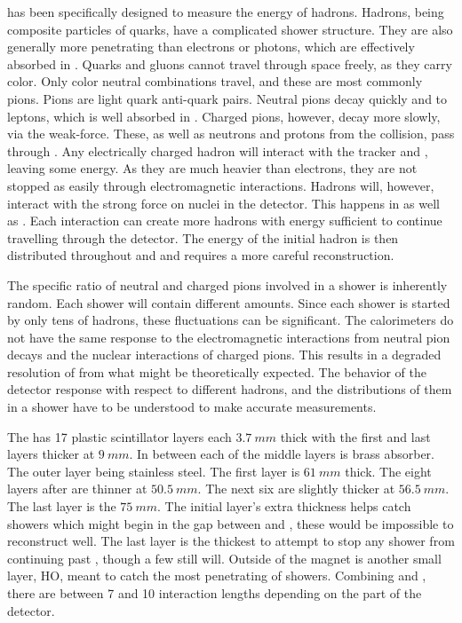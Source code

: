 \HCAL has been specifically designed to measure the energy of hadrons.  Hadrons, being composite particles of quarks, have a complicated shower structure.  They are also generally more penetrating than electrons or photons, which are effectively absorbed in \ECAL.  Quarks and gluons cannot travel through space freely, as they carry color.  Only color neutral combinations travel, and these are most commonly pions.  Pions are light quark anti-quark pairs.  Neutral pions decay quickly and to leptons, which is well absorbed in \ECAL.  Charged pions, however, decay more slowly, via the weak-force.  These, as well as neutrons and protons from the collision, pass through \ECAL.  Any electrically charged hadron will interact with the tracker and \ECAL, leaving some energy.  As they are much heavier than electrons, they are not stopped as easily through electromagnetic interactions.  Hadrons will, however, interact with the strong force on nuclei in the detector.  This happens in \ECAL as well as \HCAL.  Each interaction can create more hadrons with energy sufficient to continue travelling through the detector.  The energy of the initial hadron is then distributed throughout \ECAL and \HCAL and requires a more careful reconstruction.

The specific ratio of neutral and charged pions involved in a shower is inherently random.  Each shower will contain different amounts.  Since each shower is started by only tens of hadrons, these fluctuations can be significant.  The calorimeters do not have the same response to the electromagnetic interactions from neutral pion decays and the nuclear interactions of charged pions.  This results in a degraded resolution of \HCAL from what might be theoretically expected.  The behavior of the detector response with respect to different hadrons, and the distributions of them in a shower have to be understood to make accurate measurements.

The \CMS \HCAL has 17 plastic scintillator layers each \ensuremath{\SI{3.7}{mm}} thick with the first and last layers thicker at \ensuremath{\SI{9}{mm}}.  In between each of the middle layers is brass absorber.  The outer layer being stainless steel.  The first layer is \ensuremath{\SI{61}{mm}} thick.  The eight layers after are thinner at \ensuremath{\SI{50.5}{mm}}.  The next six are slightly thicker at \ensuremath{\SI{56.5}{mm}}.  The last layer is the \ensuremath{\SI{75}{mm}}.  The initial layer's extra thickness helps catch showers which might begin in the gap between \ECAL and \HCAL, these would be impossible to reconstruct well.  The last layer is the thickest to attempt to stop any shower from continuing past \HCAL, though a few still will.  Outside of the \CMS magnet is another small layer, HO, meant to catch the most penetrating of showers.  Combining \ECAL and \HCAL, there are between 7 and 10 interaction lengths depending on the part of the detector.

